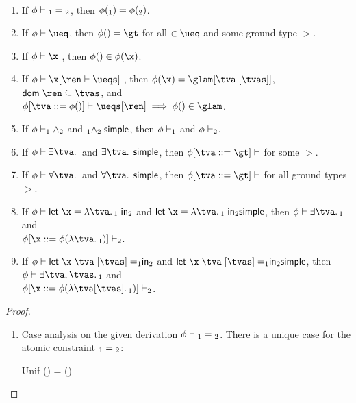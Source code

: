 \documentclass[acmsmall,screen,nonacm,review]{acmart}
\begin{document}
\begin{lemma}~
  \label{lem:simple-inversion}
  \begin{enumerate}[(\roman*)]
    \item If $\phi \vdash {\relax_1} = {\relax_2}$, then $\phi(\relax_1) = \phi(\relax_2)$.
    \item If $\semenv \th \ueq$, then $\semenv(\t) = \gt$ for all $\t \in \ueq$ and some ground type $\gt$.
    \item If $\semenv \th \capp \x \t$, then $\semenv(\t) \in \semenv(\x)$.
    \item If $\semenv \th \cpapp \x \ren \ueqs$, then $\semenv(\x) = \gabsr \tv \tvs$, $\dom \ren \subseteq \tvs$, and \\$\semenv\where{\tv \is \semenv(\t)} \th \ueqs\where\ren \implies \semenv(\t) \in \glam$.

    \item If $\phi \vdash \relax_1 \wedge \relax_2$ and $\relax_1 \wedge \relax_2 \mathrel{\mathsf{simple}}\mathclose{}$, then $\phi \vdash \relax_1$ and $\phi \vdash \relax_2$.
    \item If $\semenv \th \cexists \tv \c$ and $\cexists \tv \c \simple$, then $\semenv\where{\tv \is \gt} \th \c$ for some $\gt$.
    \item If $\semenv \th \cfor \tv \c$ and $\cfor \tv \c \simple$, then $\semenv\where{\tv \is \gt} \th \c$ for all ground types $\gt$.
    \item If $\semenv \th \clet \x \tv \cone \ctwo$ and $\clet \x \tv \cone \ctwo \simple$, then $\semenv \th \cexists \tv \cone$ and \\$\semenv\where{\x \is \semenv(\cabs \tv \cone)} \th \ctwo$.
    \item If $\semenv \th \cletr \x \tv \tvs \cone \ctwo$ and $\cletr \x \tv \tvs \cone \ctwo \simple$, then
      $\semenv \th \cexists {\tv, \tvs} \cone$ and \\$\semenv\where{\x \is \semenv(\cabsr \tv \tvs \cone)} \th \ctwo$.
  \end{enumerate}
  \begin{proof}~
    \begin{enumerate}[(\roman*)]
      \item Case analysis on the given derivation $\phi \vdash {\relax_1} = {\relax_2}$.
	There is a unique case for the atomic constraint ${\relax_1} = {\relax_2}$:
	\begin{proofcases}
	    \proofcasederivation
	      {Unif}
	      {\semenv(\tone) = \semenv(\ttwo)}
	      {\semenv \th \cunif \tone \ttwo}


\end{proofcases}
\end{enumerate}
\end{proof}
\end{lemma}
\end{document}
